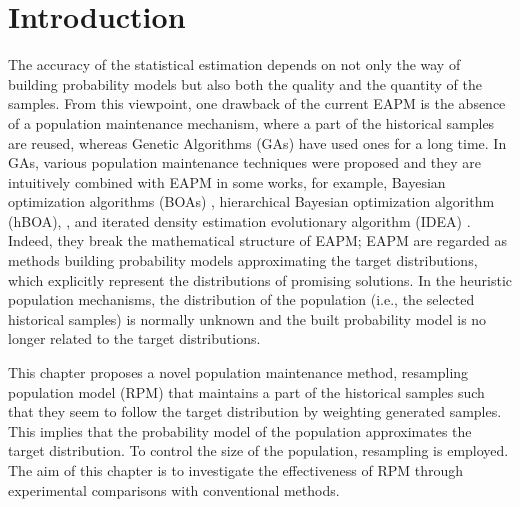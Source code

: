 \section{Introduction}
The accuracy of the statistical estimation depends on 
not only the way of building probability models
but also both the quality and the quantity of the samples.
From this viewpoint, one drawback of the current EAPM
is the absence of a population maintenance mechanism, 
where a part of the historical samples are reused,
whereas 
Genetic Algorithms (GAs) \cite{goldberg:ga} have used ones for a long time.
In GAs, various population maintenance techniques \cite{shimodaila:nitching} 
were proposed and
they are intuitively combined with EAPM in some works, 
for example, Bayesian optimization algorithms (BOAs) \cite{pelikan:99boa}, 
hierarchical Bayesian optimization algorithm (hBOA),
\cite{pelikan:escaping,pelikan:robust,pelikan:dependency}, and iterated density estimation evolutionary
algorithm (IDEA) \cite{bosman:idea,bosman:idea2}.
Indeed, they break the mathematical structure of EAPM;
EAPM are regarded as methods building probability models
approximating the target distributions, 
which explicitly represent the distributions of promising solutions.
In the heuristic population mechanisms,
the distribution of the population (i.e., the selected historical samples) is normally unknown
and the built probability model is no longer related 
to the target distributions.


This chapter proposes a novel population maintenance method,
resampling population model (RPM)
that maintains a part of the historical samples such that
they seem to follow the target distribution by weighting generated samples.
This implies that the probability model 
of the population approximates the target distribution.
To control the size of the population, resampling is employed.
The aim of this chapter is to investigate the effectiveness of RPM
through experimental comparisons with conventional methods.



